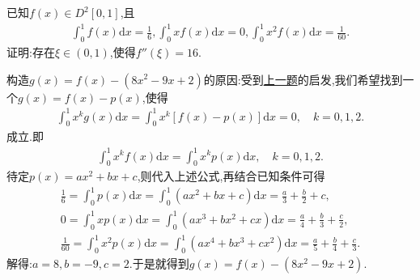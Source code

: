 \documentclass[../../main.tex]{subfiles}
\begin{document}
\begin{example}
已知$f(x)\in D^2[0,1]$,且
\begin{align*}
\int_0^1{f\left( x \right) \mathrm{d}x}=\frac{1}{6},\int_0^1{xf\left( x \right) \mathrm{d}x}=0,\int_0^1{x^2f\left( x \right) \mathrm{d}x}=\frac{1}{60}.
\end{align*}
证明:存在$\xi \in (0,1)$,使得$f''(\xi)=16$.
\end{example}
\begin{note}
构造$g(x)=f(x)-(8x^2 - 9x + 2)$的原因:受到\hyperref[example245574]{上一题}的启发,我们希望找到一个$g(x)=f(x)-p(x)$,使得
\begin{align*}
\int_0^1 x^k g(x)\mathrm{d}x =\int_0^1 x^k [f(x)-p(x)]\mathrm{d}x = 0, \quad k = 0,1,2.
\end{align*}
成立.即
\begin{align*}
\int_0^1{x^kf(x)\mathrm{d}x}=\int_0^1{x^kp(x)\mathrm{d}x},\quad k=0,1,2.
\end{align*}
待定$p(x)=ax^2+bx+c$,则代入上述公式,再结合已知条件可得
\begin{gather*}
\frac{1}{6}=\int_0^1{p(x)\mathrm{d}x}=\int_0^1{\left( ax^2+bx+c \right) \mathrm{d}x}=\frac{a}{3}+\frac{b}{2}+c,
\\
0=\int_0^1{xp(x)\mathrm{d}x}=\int_0^1{\left( ax^3+bx^2+cx \right) \mathrm{d}x}=\frac{a}{4}+\frac{b}{3}+\frac{c}{2},
\\
\frac{1}{60}=\int_0^1{x^2p(x)\mathrm{d}x}=\int_0^1{\left( ax^4+bx^3+cx^2 \right) \mathrm{d}x}=\frac{a}{5}+\frac{b}{4}+\frac{c}{3}.
\end{gather*}
解得:$a=8,b=-9,c=2$.于是就得到\(g(x)=f(x)-(8x^2 - 9x + 2)\).
\end{note}
\end{document}
